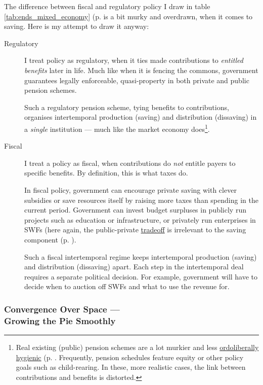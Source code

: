 The difference between fiscal and regulatory policy I draw in table \ref{tab:ends_mixed_economy} (p. \pageref{tab:ends_mixed_economy} is a bit murky and overdrawn, when it comes to saving.  Here is my attempt to draw it anyway: 
\begin{description}
	\item[Regulatory] I treat policy as regulatory, when it ties made contributions to \emph{entitled benefits} later in life. Much like when it is fencing the commons, government guarantees legally enforceable, quasi-property in both private and public pension schemes. 
	
	Such a regulatory pension scheme, tying benefits to contributions, organises intertemporal production (saving) and distribution (dissaving) in a \emph{single} institution --- much like the market economy does\footnote{
		Real existing (public) pension schemes are a lot murkier and less \hyperref[sec:ordoliberal_hygiene]{ordoliberally hygienic} (p. \pageref{sec:ordoliberal_hygiene}. Frequently, pension schedules feature equity or other policy goals such as child-rearing. In these, more realistic cases, the link between contributions and benefits is distorted.}.
	\item[Fiscal] I treat a policy as fiscal, when contributions do \emph{not} entitle payers to specific benefits. By definition, this is what taxes do.
	
	In fiscal policy, government can encourage private saving with clever subsidies or save resources itself by raising more taxes than spending in the current period. Government can invest budget surpluses in publicly run projects such as education or infrastructure, or privately run enterprises in \glspl{SWF} (here again, the public-private \hyperref[sec:tradeoffs]{tradeoff} is irrelevant to the saving component (p. \pageref{tradeoffs}).
	
	Such a fiscal intertemporal regime keeps intertemporal production (saving) and distribution (dissaving) apart. Each step in the intertemporal deal requires a separate political decision. For example, government will have to decide when to auction off \glspl{SWF} and what to use the revenue for.
\end{description}

\subsubsection[Convergence Over Space]{Convergence Over Space ---\\Growing the Pie Smoothly} \label{sec:space}

